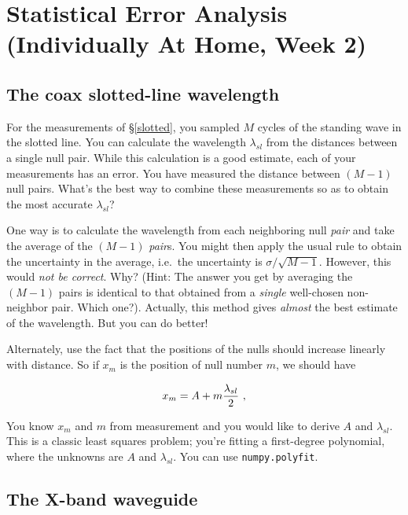 \documentclass[11pt,preprint]{aastex}
\begin{document}
\section {Statistical Error Analysis (Individually At Home, Week 2)} \label{secondweek}

\subsection{The coax slotted-line wavelength} \label{lbandcoax} 
\label{slottedls}

\noindent
For the measurements of \S \ref{slotted}, you sampled $M$
cycles of the standing wave in the slotted line. You can
calculate the wavelength $\lambda_{sl}$ from the distances
between a single null pair. While this calculation is a good
estimate, each of your measurements has an error. You have
measured the distance between $(M-1)$ null pairs. What's the
best way to combine these measurements so as to obtain the most
accurate $\lambda_{sl}$?

One way is to calculate the wavelength from each neighboring
null {\it pair} and take the average of the $(M-1)$ {\it pair}s.  You
might then apply the usual rule to obtain the uncertainty in the
average, i.e.\ the uncertainty is $\sigma/\sqrt{M-1}$.
However, this would {\it not be correct}.  Why? (Hint: The answer you
get by averaging the $(M-1)$ pairs is identical to that obtained from a
{\it single} well-chosen non-neighbor pair.  Which one?).  Actually,
this method gives {\it almost} the best estimate of the wavelength.  But
you can do better!

Alternately, use the fact that the positions of the nulls should increase linearly
with distance. So if $x_{m}$ is the position of null number $m$, we
should have

\begin{equation}
x_m = A + m {\lambda_{sl} \over 2} \ ,
\end{equation}

\noindent You know $x_m$ and $m$ from measurement and you would like to
derive $A$ and $\lambda_{sl}$. This is a classic least squares problem;
you're fitting a first-degree polynomial, where the unknowns are $A$ and
$\lambda_{sl}$. You can use {\tt numpy.polyfit}.

\subsection{The X-band waveguide}
\end{document}
